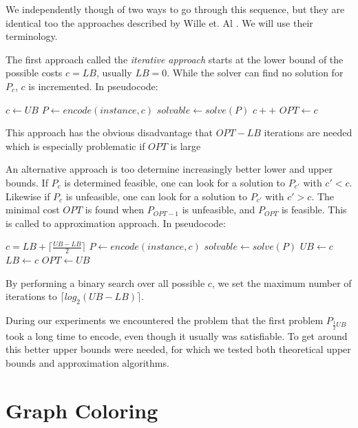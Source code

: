 \documentclass{sig-alternate}
\newcommand{\mli}[1]{\mathit{#1}}
\begin{document}
We independently though of two ways to go through this sequence, but they are identical too the approaches described by Wille et. Al \cite{wille2008using}.
We will use their terminology.

The first approach called the \emph{iterative approach} starts at the lower bound of the possible costs $c = \mli{LB}$, usually $\mli{LB} = 0$.
While the solver can find no solution for $P_c$, $c$ is incremented.
In pseudocode:

\begin{algorithmic}
\State $c \gets \mli{UB}$
	\State $P \gets encode(instance, c)$
	\State $solvable \gets solve(P)$
		\State $c++$
	\EndIf
\EndWhile
\State $\mli{OPT} \gets c$
\end{algorithmic}

This approach has the obvious disadvantage that $\mli{OPT}-\mli{LB}$ iterations are needed which is especially problematic if $\mli{OPT}$ is large

An alternative approach is too determine increasingly better lower and upper bounds.
If $P_c$ is determined feasible, one can look for a solution to $P_{c'}$ with $c' < c$. Likewise if $P_c$ is unfeasible, one can look for a solution to $P_{c'}$ with $c' > c$.
The minimal cost $OPT$ is found when $P_{OPT-1}$ is unfeasible, and $P_{\mli{OPT}}$ is feasible. This is called to approximation approach.
In pseudocode:

\begin{algorithmic}
\While {$\mli{LB} \neq \mli{UB} - 1$}
	\State $c = \mli{LB} + \lceil \frac{\mli{UB} - \mli{LB}}{2} \rceil$
	\State $P \gets encode(instance, c)$
	\State $solvable \gets solve(P)$
		\State $\mli{UB} \gets c$
	\Else
		\State $\mli{LB} \gets c$
	\EndIf
\EndWhile
\State $\mli{OPT} \gets \mli{UB}$
\end{algorithmic}

By performing a binary search over all possible $c$, we set the maximum number of iterations to $\lceil log_2(\mli{UB}-\mli{LB}) \rceil$.

During our experiments we encountered the problem that the first problem $P_{\frac{1}{2}\mli{UB}}$ took a long time to encode, even though it usually was satisfiable.
To get around this better upper bounds were needed, for which we tested both theoretical upper bounds and approximation algorithms.


\section{Graph Coloring}
\label{sec:graph_coloring}
\end{document}
